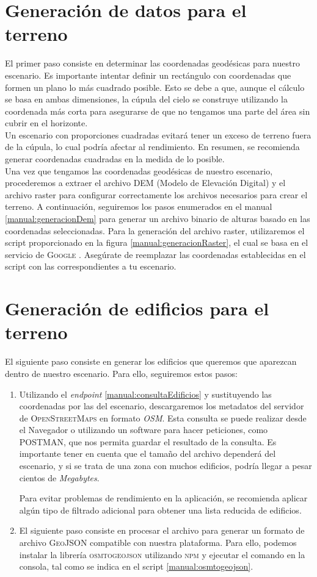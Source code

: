 \documentclass[a4paper, 11pt]{book}
\begin{document}
\section{Generación de datos para el terreno}
El primer paso consiste en determinar las coordenadas geodésicas para nuestro escenario. Es importante intentar definir un rectángulo con coordenadas que formen un plano lo más cuadrado posible. Esto se debe a que, aunque el cálculo se basa en ambas dimensiones, la cúpula del cielo se construye utilizando la coordenada más corta para asegurarse de que no tengamos una parte del área sin cubrir en el horizonte. \\
Un escenario con proporciones cuadradas evitará tener un exceso de terreno fuera de la cúpula, lo cual podría afectar al rendimiento. En resumen, se recomienda generar coordenadas cuadradas en la medida de lo posible.\\
Una vez que tengamos las coordenadas geodésicas de nuestro escenario, procederemos a extraer el archivo \textsc{DEM} (Modelo de Elevación Digital) y el archivo raster para configurar correctamente los archivos necesarios para crear el terreno. A continuación, seguiremos los pasos enumerados en el manual \ref{manual:generacionDem} para generar un archivo binario de alturas basado en las coordenadas seleccionadas. Para la generación del archivo raster, utilizaremos el script proporcionado en la figura \ref{manual:generacionRaster}, el cual se basa en el servicio de \textsc{Google} \cite{googleearthengine}. Asegúrate de reemplazar las coordenadas establecidas en el script con las correspondientes a tu escenario.

\section{Generación de edificios para el terreno}
El siguiente paso consiste en generar los edificios que queremos que aparezcan dentro de nuestro escenario. Para ello, seguiremos estos pasos:

\begin{enumerate}
    \item Utilizando el \emph{endpoint} \ref{manual:consultaEdificios} y sustituyendo las coordenadas por las del escenario, descargaremos los metadatos del servidor de \textsc{OpenStreetMaps} en formato \emph{OSM}. Esta consulta se puede realizar desde el Navegador o utilizando un software para hacer peticiones, como \textsc{POSTMAN}, que nos permita guardar el resultado de la consulta. Es importante tener en cuenta que el tamaño del archivo dependerá del escenario, y si se trata de una zona con muchos edificios, podría llegar a pesar cientos de \emph{Megabytes}. 
    
    Para evitar problemas de rendimiento en la aplicación, se recomienda aplicar algún tipo de filtrado adicional para obtener una lista reducida de edificios.
    \item El siguiente paso consiste en procesar el archivo para generar un formato de archivo \textsc{GeoJSON} compatible con nuestra plataforma. Para ello, podemos instalar la librería \textsc{osmtogeojson} utilizando \textsc{npm} y ejecutar el comando en la consola, tal como se indica en el script \ref{manual:osmtogeojson}.
\end{enumerate}
\end{document}
